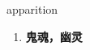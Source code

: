 
\begin{frame}
{\huge apparition}
\begin{center}
\begin{enumerate}\Large
  \item \textbf{鬼魂，幽灵}
\end{enumerate}
\end{center}
\end{frame}
